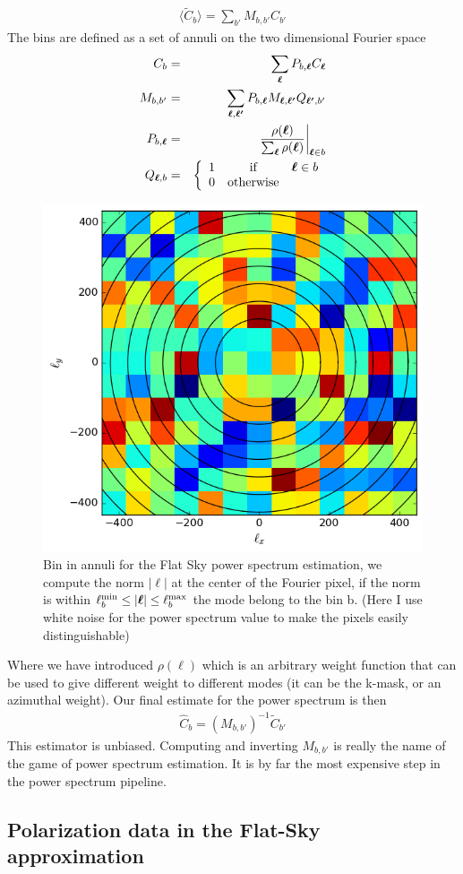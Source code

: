 \documentclass[a4paper, 11pt]{article}
\def\ba{\begin{eqnarray}}
\def\ea{\end{eqnarray}}
\begin{document}
\ba
\langle \tilde{C}_{b} \rangle= \sum_{b'} M_{b, b'}  C_{b'} 
\ea 
The bins are defined as a set of annuli on the two dimensional Fourier space
\ba
C_{b} &=&\sum_{\bm \ell} P_{b, \bm{\ell}} C_{\bm{\ell}} \\
M_{b, b'} &=& \sum_{\bm{\ell},\bm{\ell'}} P_{b, \bm{\ell}} M_{\bm{\ell}, \bm{\ell'}} Q_{\bm{\ell'}, b'} \\
P_{b, \bm{\ell}}  &=& \frac{\rho(\bm{\ell})}{\sum_{\bm{\ell}}\rho(\bm{\ell})} \bigg{|}_{\bm{\ell} \in b}\\
Q_{ \bm{\ell},b} &=& \left\{ \begin{array}{rcl} 1 & \mbox{if} &  \bm{\ell} \in b \\ 0 & \mbox{otherwise}
\end{array}\right. 
\ea

\begin{figure}
  \centering
  \includegraphics[width=0.5\columnwidth]{p2d.png}
  \caption{Bin in annuli for the Flat Sky power spectrum estimation, we compute the norm $|\bm{\ell}|$ at the center of the Fourier pixel, if the norm is within  $\ell^{\rm min}_{b} \leq |{\bm{\ell}| \leq \ell^{\rm max}_{b}}$  the mode belong to the bin b. (Here I use white noise for the power spectrum value to make the pixels easily distinguishable)}
  \label{fig:p2dbin}
\end{figure}



Where we have introduced $\rho(\bm{\ell})$ which is an arbitrary weight function that can be used to give different weight to different modes (it can be the k-mask, or an azimuthal weight).
Our final estimate for the power spectrum is then
\ba
\hat{C}_{b}= (M_{b, b'})^{-1} \tilde{C}_{b'} 
\ea
This estimator is unbiased. Computing and inverting $M_{b, b'}$ is really the name of the game of power spectrum estimation. It is by far the most expensive step in the power spectrum pipeline.

\subsection{Polarization data in the Flat-Sky approximation}
\end{document}
